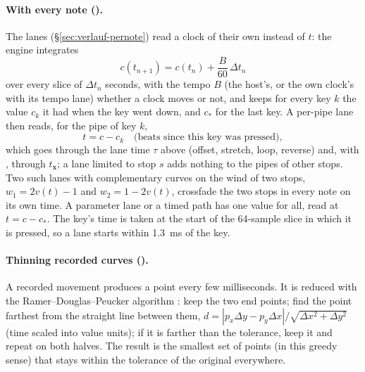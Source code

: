 \paragraph{With every note ().} The lanes  (\S\ref{sec:verlauf-pernote}) read a
clock of their own instead of $t$: the engine integrates
\begin{equation}
  c(t_{n+1}) = c(t_n) + \frac{B}{60}\,\Delta t_n
\end{equation}
over every slice of $\Delta t_n$ seconds, with the tempo $B$ (the host's, or the own clock's with its tempo lane)
whether a clock moves or not, and keeps for every key $k$ the value $c_k$ it had when the key went down, and $c_\ast$
for the last key. A per-pipe lane then reads, for the pipe of key $k$,
\begin{equation}
  t = c - c_k \quad\text{(beats since this key was pressed)},
\end{equation}
which goes through the lane time $\tau$ above (offset, stretch, loop, reverse) and, with , through
$t_\mathbf{x}$; a lane limited to stop $s$ adds nothing to the pipes of other stops. Two such lanes with complementary
curves on the wind of two stops, $w_1 = 2v(t)-1$ and $w_2 = 1-2v(t)$, crossfade the two stops in every note on its own
time. A parameter lane or a timed path has one value for all, read at $t = c - c_\ast$. The key's time is taken at the
start of the 64-sample slice in which it is pressed, so a lane starts within \SI{1.3}{ms} of the key.

\paragraph{Thinning recorded curves ().} A recorded movement produces a point every few milliseconds. It is
reduced with the Ramer--Douglas--Peucker algorithm \citep{douglas1973}: keep the two end points; find the point farthest
from the straight line between them, $d = |p_x\Delta y - p_y\Delta x|/\sqrt{\Delta x^2+\Delta y^2}$ (time scaled into
value units); if it is farther than the tolerance, keep it and repeat on both halves. The result is the smallest set of
points (in this greedy sense) that stays within the tolerance of the original everywhere.

